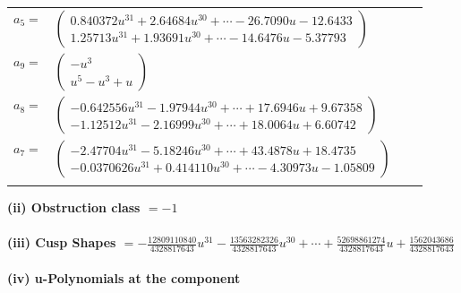 \documentclass[1p]{elsarticle_modified}
\theoremstyle{definition}
\begin{document}
\begin{tabular}{m{7pt} m{180pt} m{7pt} m{180pt} }
\flushright $a_{5}=$&$\begin{pmatrix}0.840372 u^{31}+2.64684 u^{30}+\cdots-26.7090 u-12.6433\\1.25713 u^{31}+1.93691 u^{30}+\cdots-14.6476 u-5.37793\end{pmatrix}$ \\
\flushright $a_{9}=$&$\begin{pmatrix}- u^3\\u^5- u^3+u\end{pmatrix}$ \\
\flushright $a_{8}=$&$\begin{pmatrix}-0.642556 u^{31}-1.97944 u^{30}+\cdots+17.6946 u+9.67358\\-1.12512 u^{31}-2.16999 u^{30}+\cdots+18.0064 u+6.60742\end{pmatrix}$ \\
\flushright $a_{7}=$&$\begin{pmatrix}-2.47704 u^{31}-5.18246 u^{30}+\cdots+43.4878 u+18.4735\\-0.0370626 u^{31}+0.414110 u^{30}+\cdots-4.30973 u-1.05809\end{pmatrix}$\\&\end{tabular}
\flushleft \textbf{(ii) Obstruction class $= -1$}\\~\\
\flushleft \textbf{(iii) Cusp Shapes $= -\frac{12809110840}{4328817643} u^{31}-\frac{13563282326}{4328817643} u^{30}+\cdots+\frac{52698861274}{4328817643} u+\frac{1562043686}{4328817643}$}\\~\\
\newpage\renewcommand{\arraystretch}{1}
\flushleft \textbf{(iv) u-Polynomials at the component}\newline \\
\end{document}
